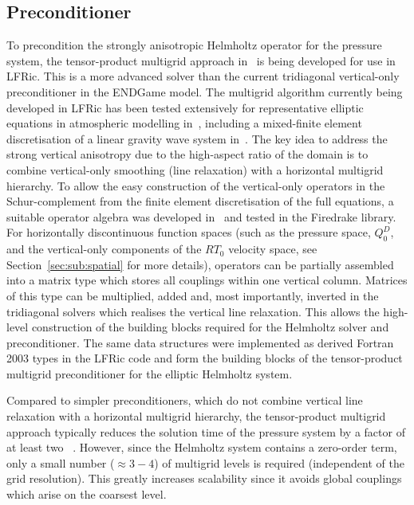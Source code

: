 \documentclass[review,times]{elsarticle}
\begin{document}
\subsection{\label{sec:sub:preconditioner}Preconditioner}

To precondition the strongly anisotropic Helmholtz operator for the
pressure system, the tensor-product multigrid approach in~\cite{Borm2001} 
is being developed for use in LFRic. This is a more advanced solver than
the current tridiagonal vertical-only preconditioner in the ENDGame
model. The multigrid algorithm currently being developed in LFRic has been tested
extensively for representative elliptic equations in atmospheric
modelling in~\cite{Mueller2014,Dedner2016}, including a mixed-finite
element discretisation of a linear gravity wave system in~\cite{Mitchell2016}. 
The key idea to address the strong vertical
anisotropy due to the high-aspect ratio of the domain is to combine
vertical-only smoothing (line relaxation) with a horizontal multigrid
hierarchy. To allow the easy construction of the vertical-only
operators in the Schur-complement from the finite element
discretisation of the full equations, a suitable operator algebra was
developed in~\cite{Mitchell2016} and tested in the Firedrake
library. For horizontally discontinuous function spaces (such as the
pressure space, $Q_0^D$, and the vertical-only components of the $RT_0$ 
velocity space, see Section~\ref{sec:sub:spatial} for more details), 
operators can be partially assembled into a matrix type which 
stores all couplings within one vertical column. Matrices of this type can be
multiplied, added and, most importantly, inverted in the tridiagonal
solvers which realises the vertical line relaxation. This allows the
high-level construction of the building blocks required for the
Helmholtz solver and preconditioner. The same data structures were
implemented as derived Fortran 2003 types in the LFRic code and form
the building blocks of the tensor-product multigrid preconditioner for
the elliptic Helmholtz system.


Compared to simpler preconditioners, which do not combine vertical
line relaxation with a horizontal multigrid hierarchy, the
tensor-product multigrid approach typically reduces the solution time
of the pressure system by a factor of at least two
~\cite{Mueller2014,Mitchell2016}. However, since the Helmholtz system
contains a zero-order term, only a small number ($\approx 3-4$) of
multigrid levels is required (independent of the grid
resolution). This greatly increases scalability since it avoids global
couplings which arise on the coarsest level.
\end{document}
